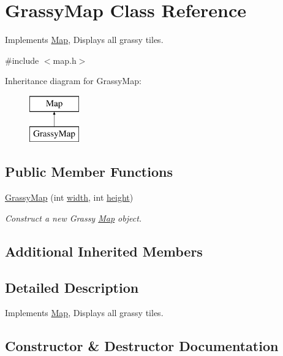 \hypertarget{classGrassyMap}{}\section{Grassy\+Map Class Reference}
\label{classGrassyMap}


Implements \mbox{\hyperlink{classMap}{Map}}, Displays all grassy tiles.  




{\ttfamily \#include $<$map.\+h$>$}

Inheritance diagram for Grassy\+Map\+:\begin{figure}[H]
\begin{center}
\leavevmode
\includegraphics[height=2.000000cm]{classGrassyMap}
\end{center}
\end{figure}
\subsection*{Public Member Functions}
\begin{DoxyCompactItemize}
\item 
\mbox{\hyperlink{classGrassyMap_ab150f8fa0936231b70c5546b43c5075a}{Grassy\+Map}} (int \mbox{\hyperlink{classMap_a22c34c8f3c83d69a4ceceefbaf3eec07}{width}}, int \mbox{\hyperlink{classMap_a66196099a6d3dac0df04189446d2adb8}{height}})
\begin{DoxyCompactList}\small\item\em Construct a new Grassy \mbox{\hyperlink{classMap}{Map}} object. \end{DoxyCompactList}\end{DoxyCompactItemize}
\subsection*{Additional Inherited Members}


\subsection{Detailed Description}
Implements \mbox{\hyperlink{classMap}{Map}}, Displays all grassy tiles. 



\subsection{Constructor \& Destructor Documentation}
\mbox{\label{classGrassyMap_ab150f8fa0936231b70c5546b43c5075a}} 
